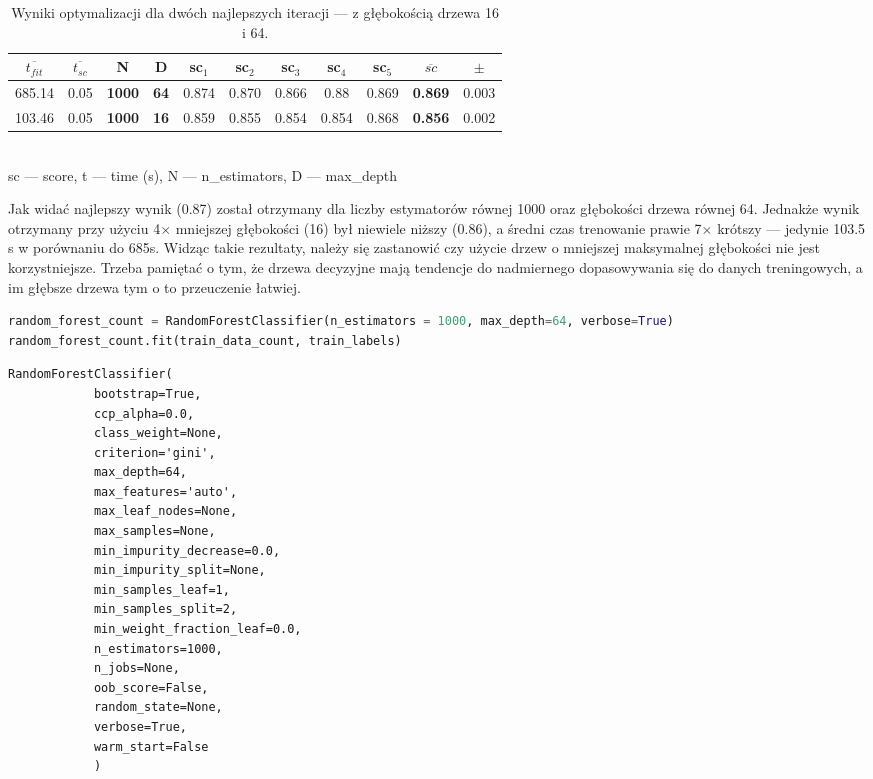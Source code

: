 \begin{table}
	\caption{Wyniki optymalizacji dla dwóch najlepszych iteracji --- z głębokością drzewa 16 i 64.}
	\begin{center}
		\begin{tabular}{c  c  || c || c || c  c  c  c  c  || c  || c }
			\hline
			$\overline{t_{fit}}$&$\overline{t_{sc}}$ &\textbf{N} & \textbf{D}	& sc$_1$&	sc$_2$ &sc$_3$ &	sc$_4$ &	sc$_5$	& \textbf{$\overline{sc}$ }&	$\pm$	\\
			\hline
			685.14	&	0.05	&	\textbf{1000}& \textbf{64}	&	0.874	& 0.870 &	0.866&	0.88 &	0.869 &	\textbf{0.869}&	0.003 \\
			103.46& 		0.05 &		\textbf{1000}	& \textbf{16}	& 0.859 &	0.855 &	0.854 &	0.854 &	0.868& 	\textbf{0.856}& 0.002 \\
			\hline
		\end{tabular} \\
		{\scriptsize 	sc --- score, t --- time (s), N --- n\_estimators, D --- max\_depth}
	\end{center}
\end{table}


\noindent Jak widać najlepszy wynik (0.87) został otrzymany dla liczby estymatorów równej 1000 oraz głębokości drzewa równej 64. Jednakże wynik otrzymany przy użyciu 4$\times$ mniejszej głębokości (16) był niewiele niższy (0.86), a średni czas trenowanie prawie 7$\times$ krótszy --- jedynie 103.5 s w porównaniu do 685s. Widząc takie rezultaty, należy się zastanowić czy użycie drzew o mniejszej maksymalnej głębokości nie jest korzystniejsze. Trzeba pamiętać o tym, że drzewa decyzyjne mają tendencje do nadmiernego dopasowywania się do danych treningowych, a im głębsze drzewa tym o to przeuczenie łatwiej.


\begin{lstlisting}[language=Python,frame=single, breaklines=true, caption=Trenowanie modelu lasu losowego dla 1000 estymatorów i głębokości 64.,label=code:rf-train]
random_forest_count = RandomForestClassifier(n_estimators = 1000, max_depth=64, verbose=True)
random_forest_count.fit(train_data_count, train_labels)
\end{lstlisting}

\begin{Verbatim}
RandomForestClassifier(
			bootstrap=True,
			ccp_alpha=0.0,
			class_weight=None,
			criterion='gini',
			max_depth=64,
			max_features='auto',
			max_leaf_nodes=None,
			max_samples=None,
			min_impurity_decrease=0.0,
			min_impurity_split=None,
			min_samples_leaf=1,
			min_samples_split=2,
			min_weight_fraction_leaf=0.0,
			n_estimators=1000,
			n_jobs=None,
			oob_score=False,
			random_state=None,
			verbose=True,
			warm_start=False
			)
\end{Verbatim}


